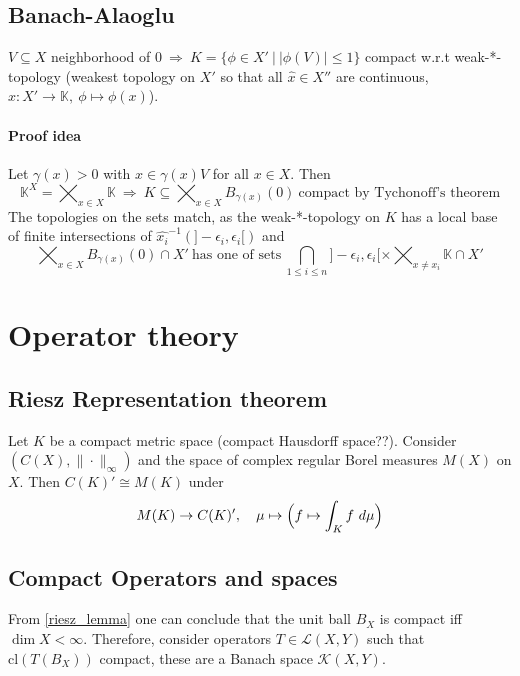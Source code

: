 \documentclass{scrartcl}
\begin{document}
\subsection{Banach-Alaoglu}
$V \subseteq X$ neighborhood of $0 \ \Rightarrow \ K = \{ \phi \in X' \ | \ |\phi(V)| \leq 1 \}$ compact w.r.t weak-*-topology (weakest topology on $X'$ so that all $\hat{x} \in X''$ are continuous, $\hat{x}: X' \to \mathbb{K}, \ \phi \mapsto \phi(x)$).
\paragraph{Proof idea} Let $\gamma(x) > 0$ with $x \in \gamma(x)V$ for all $x \in X$. Then
\begin{equation}
    \mathbb{K}^X = \bigtimes_{x \in X} \mathbb{K} \ \Rightarrow \ K \subseteq \bigtimes_{x \in X} B_{\gamma(x)}(0) \ \text{compact by Tychonoff's theorem}\nonumber
\end{equation}
The topologies on the sets match, as the weak-*-topology on $K$ has a local base of finite intersections of $\hat{x_i}^{-1}(]-\epsilon_i, \epsilon_i[)$ and 
\begin{equation}
    \bigtimes_{x \in X} B_{\gamma(x)}(0) \cap X' \ \text{has one of sets} \ \bigcap_{1 \leq i \leq n} ]-\epsilon_i, \epsilon_i[ \times \bigtimes_{x \neq x_i} \mathbb{K} \cap X' \nonumber
\end{equation}

\section{Operator theory}

\subsection{Riesz Representation theorem}
Let $K$ be a compact metric space (compact Hausdorff space??). Consider $(C(X), \|\cdot\|_\infty)$ and the space of complex regular Borel measures $M(X)$ on $X$. Then $C(K)' \cong M(K)$ under
\begin{equation*}
    M(K) \to C(K)', \quad \mu \mapsto \Bigl(f \mapsto \int_K f \ d\mu\Bigr)
\end{equation*}

\subsection{Compact Operators and spaces}
From \ref{riesz_lemma} one can conclude that the unit ball $B_X$ is compact iff $\dim X < \infty$. Therefore, consider operators $T \in \mathcal{L}(X, Y)$ such that $\mathrm{cl}(T(B_X))$ compact, these are a Banach space $\mathcal{K}(X, Y)$.
\end{document}
